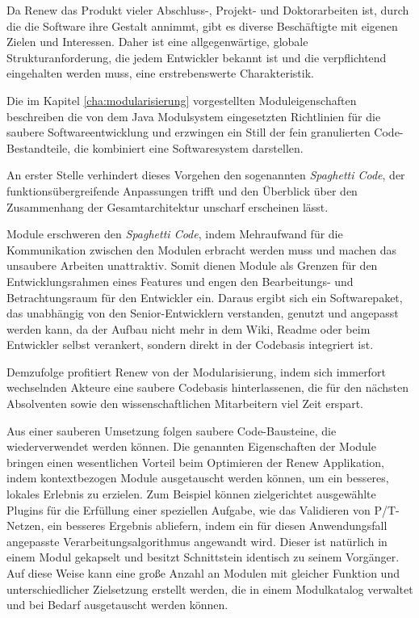 	Da Renew das Produkt vieler Abschluss-, Projekt- und Doktorarbeiten ist, durch die die Software ihre Gestalt annimmt, gibt es diverse Beschäftigte mit eigenen Zielen und Interessen. Daher ist eine allgegenwärtige, globale Strukturanforderung, die jedem Entwickler bekannt ist und die verpflichtend eingehalten werden muss, eine erstrebenswerte Charakteristik.  \newline

	Die im Kapitel \ref{cha:modularisierung} vorgestellten Moduleigenschaften beschreiben die von dem Java Modulsystem eingesetzten Richtlinien für die saubere Softwareentwicklung und erzwingen ein Still der fein granulierten Code-Bestandteile, die kombiniert eine Softwaresystem darstellen. \newline

	An erster Stelle verhindert dieses Vorgehen den sogenannten \textit{Spaghetti Code}, der funktionsübergreifende Anpassungen trifft und den Überblick über den Zusammenhang der Gesamtarchitektur unscharf erscheinen lässt.  \newline

	Module erschweren den \textit{Spaghetti Code}, indem Mehraufwand für die Kommunikation zwischen den Modulen erbracht werden muss und machen das unsaubere Arbeiten unattraktiv. Somit dienen Module als Grenzen für den Entwicklungsrahmen eines Features und engen den Bearbeitungs- und Betrachtungsraum für den Entwickler ein. Daraus ergibt sich ein Softwarepaket, das unabhängig von den Senior-Entwicklern verstanden, genutzt und angepasst werden kann, da der Aufbau nicht mehr in dem Wiki, Readme oder beim Entwickler selbst verankert, sondern direkt in der Codebasis integriert ist.  \newline

	Demzufolge profitiert Renew von der Modularisierung, indem sich immerfort wechselnden Akteure eine saubere Codebasis hinterlassenen, die für den nächsten Absolventen sowie den wissenschaftlichen Mitarbeitern viel Zeit erspart. \bigbreak

	Aus einer sauberen Umsetzung folgen saubere Code-Bausteine, die wiederverwendet werden können. Die genannten Eigenschaften der Module bringen einen wesentlichen Vorteil beim Optimieren der Renew Applikation, indem kontextbezogen Module ausgetauscht werden können, um ein besseres, lokales Erlebnis zu erzielen. Zum Beispiel können zielgerichtet ausgewählte Plugins für die Erfüllung einer speziellen Aufgabe, wie das Validieren von P/T-Netzen, ein besseres Ergebnis abliefern, indem ein für diesen Anwendungsfall angepasste Verarbeitungsalgorithmus angewandt wird. Dieser ist natürlich in einem Modul gekapselt und besitzt Schnittstein identisch zu seinem Vorgänger. Auf diese Weise kann eine große Anzahl an Modulen mit gleicher Funktion und unterschiedlicher Zielsetzung erstellt werden, die in einem Modulkatalog verwaltet und bei Bedarf ausgetauscht werden können.

